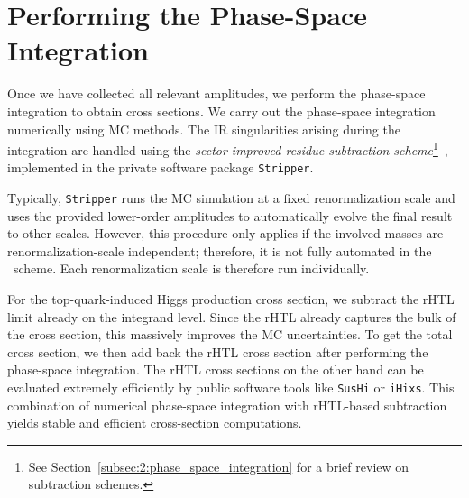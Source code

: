 \section{Performing the Phase-Space Integration}
Once we have collected all relevant amplitudes, we perform the phase-space integration to obtain cross sections. We carry out the phase-space integration numerically using \acs{MC} methods. The \acs{IR} singularities arising during the integration are handled using the \textit{sector-improved residue subtraction scheme}\footnote{See Section~\ref{subsec:2:phase_space_integration} for a brief review on subtraction schemes.}~\cite{Czakon:2010td}, implemented in the private software package \texttt{Stripper}.

Typically, \texttt{Stripper} runs the \acs{MC} simulation at a fixed renormalization scale and uses the provided lower-order amplitudes to automatically evolve the final result to other scales. However, this procedure only applies if the involved masses are renormalization-scale independent; therefore, it is not fully automated in the \MS\ scheme. Each renormalization scale is therefore run individually.

For the top-quark-induced Higgs production cross section, we subtract the \acs{rHTL} limit already on the integrand level. Since the \acs{rHTL} already captures the bulk of the cross section, this massively improves the \acs{MC} uncertainties. To get the total cross section, we then add back the \acs{rHTL} cross section after performing the phase-space integration. The \acs{rHTL} cross sections on the other hand can be evaluated extremely efficiently by public software tools like \texttt{SusHi} or \texttt{iHixs}. This combination of numerical phase-space integration with \acs{rHTL}-based subtraction yields stable and efficient cross-section computations.

